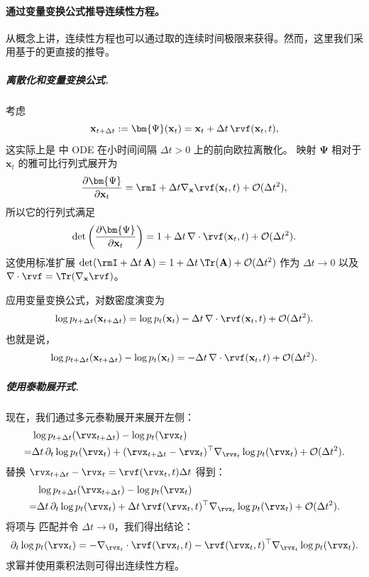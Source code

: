\paragraph{通过变量变换公式推导连续性方程。} 从概念上讲，连续性方程也可以通过取的连续时间极限来获得。然而，这里我们采用基于的更直接的推导。
\subparagraph{离散化和变量变换公式.}
考虑
\[
\mathbf{x}_{t+\Delta t} := \bm{\Psi}(\mathbf{x}_t) = \mathbf{x}_t + \Delta t\, \rvf(\mathbf{x}_t, t),
\]
这实际上是  中 ODE 在小时间间隔 $\Delta t > 0$ 上的前向欧拉离散化。
映射 $\bm{\Psi}$ 相对于 $\mathbf{x}_t$ 的雅可比行列式展开为
\[
\frac{\partial \bm{\Psi}}{\partial \mathbf{x}_t} = \rmI + \Delta t \nabla_{\mathbf{x}} \rvf(\mathbf{x}_t, t) + \mathcal{O}(\Delta t^2),
\]
所以它的行列式满足
\[
\det\left( \frac{\partial \bm{\Psi}}{\partial \mathbf{x}_t} \right) = 1 + \Delta t\, \nabla \cdot \rvf(\mathbf{x}_t, t) + \mathcal{O}(\Delta t^2).
\]
这使用标准扩展 $\det(\rmI + \Delta t\, \mathbf{A}) = 1 + \Delta t\, \Tr(\mathbf{A}) + \mathcal{O}(\Delta t^2)$ 作为 $\Delta t \to 0$ 以及 $\nabla \cdot \rvf = \Tr(\nabla_{\mathbf{x}} \rvf)$。

应用变量变换公式，对数密度演变为
\begin{align*}
\log p_{t+\Delta t}(\mathbf{x}_{t+\Delta t}) = \log p_t(\mathbf{x}_t) - \Delta t\, \nabla \cdot \rvf(\mathbf{x}_t, t) + \mathcal{O}(\Delta t^2).
\end{align*}
也就是说，
\begin{align}
    \label{eq:log-density-diff}
\log p_{t+\Delta t}(\mathbf{x}_{t+\Delta t}) - \log p_t(\mathbf{x}_t) = - \Delta t\, \nabla \cdot \rvf(\mathbf{x}_t, t) + \mathcal{O}(\Delta t^2).
\end{align}

\subparagraph{使用泰勒展开式.}
现在，我们通过多元泰勒展开来展开左侧：
\begin{align*}
    &\log p_{t+\Delta t}(\rvx_{t+\Delta t})
    - \log p_t(\rvx_t)
    \\= &\Delta t\, \partial_t \log p_t(\rvx_t)
    + (\rvx_{t+\Delta t} - \rvx_t)^\top \nabla_{\rvx_t} \log p_t(\rvx_t)
    + \mathcal{O}(\Delta t^2).
\end{align*}
替换 $\rvx_{t+\Delta t} - \rvx_t = \rvf(\rvx_t, t)\Delta t$ 得到：
\begin{align*}
    &\log p_{t+\Delta t}(\rvx_{t+\Delta t})
    - \log p_t(\rvx_t)
    \\= & \Delta t\, \partial_t \log p_t(\rvx_t)
    + \Delta t\, \rvf(\rvx_t, t)^\top \nabla_{\rvx_t} \log p_t(\rvx_t)
    + \mathcal{O}(\Delta t^2).
\end{align*}
将项与  匹配并令 $\Delta t \to 0$，我们得出结论：
\begin{equation*}
    \partial_t \log p_t(\rvx_t)
    = - \nabla_{\rvx_t} \cdot \rvf(\rvx_t, t)
    - \rvf(\rvx_t, t)^\top \nabla_{\rvx_t} \log p_t(\rvx_t).
\end{equation*}
求幂并使用乘积法则可得出连续性方程。


